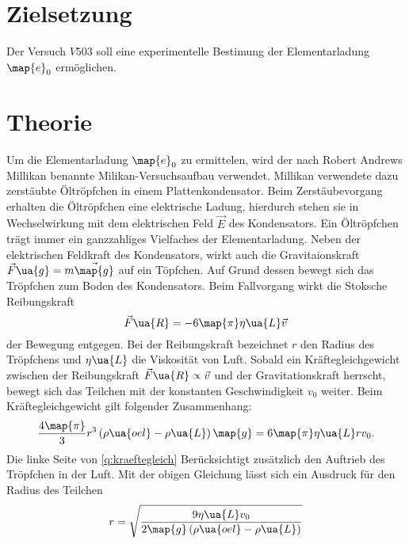 \setcounter{page}{1}
\section*{Zielsetzung}
Der Versuch $V503$ soll eine experimentelle Bestimung der Elementarladung $\map{e}_0$ ermöglichen.
\section{Theorie}
Um die Elementarladung $\map{e}_0$ zu ermittelen, wird der nach Robert Andrews Millikan benannte
Milikan-Versuchsaufbau verwendet. Millikan verwendete dazu zerstäubte Öltröpfchen in einem
Plattenkondensator. Beim Zerstäubevorgang erhalten die Öltröpfchen eine elektrische
Ladung, hierdurch stehen sie in Wechselwirkung mit dem elektrischen Feld $\vec{E}$ des
Kondensators. Ein Öltröpfchen trägt immer ein ganzzahliges Vielfaches der Elementarladung.
Neben der elektrischen Feldkraft des Kondensators, wirkt auch die Gravitaionskraft
$\vec{F}\ua{g}=m\vec{\map{g}}$ auf ein Töpfchen.
Auf Grund dessen bewegt sich das Tröpfchen zum Boden
des Kondensators. Beim Fallvorgang wirkt die Stoksche Reibungskraft
\begin{equation*}
  \vec{F}\ua{R}=-6\map{\pi}\eta\ua{L}\vec{v}
\end{equation*}
der Bewegung entgegen. Bei der Reibungskraft bezeichnet $r$ den Radius des
Tröpfchens und $\eta\ua{L}$ die Viskosität von Luft. Sobald ein Kräftegleichgewicht
zwischen der Reibungskraft $\vec{F}\ua{R}\propto \vec{v}$ und der Gravitationskraft
herrscht, bewegt sich das Teilchen mit der konstanten Geschwindigkeit $v_0$ weiter.
Beim Kräftegleichgewicht gilt folgender Zusammenhang:
\begin{equation}
  \label{eq:kraeftegleich}
  \frac{4\map{\pi}}{3}r^3\left(\rho\ua{oel}-\rho\ua{L}\right)\map{g}=6\map{\pi}\eta\ua{L}r v_0.
\end{equation}
Die linke Seite von \eqref{q:kraeftegleich} Berücksichtigt zusätzlich den Auftrieb des
Tröpfchen in der Luft. Mit der obigen Gleichung lässt sich ein Ausdruck für den Radius
des Teilchen
\begin{equation}
  \label{eq:radius_teilchen}
  r=\sqrt{\frac{9\eta\ua{L}v_0}{2\map{g}\left(\rho\ua{oel}-\rho\ua{L}\right)}}
\end{equation}

